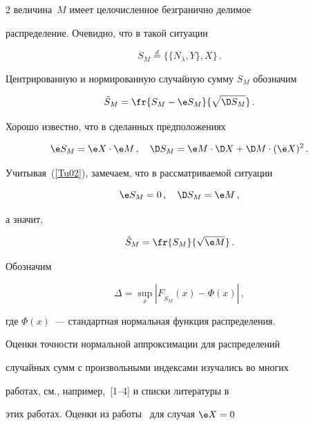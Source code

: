 \begin{multicols}{2}
величина~$M$ имеет целочисленное безгранично делимое


распределение. Очевидно, что в такой ситуации


\begin{equation}


S_M \stackrel{d}{=} \{\{N_{\lambda},Y\},X\}\,.


\label{gp1}


\end{equation}


Центрированную и нормированную случайную сумму $S_M$ обозначим


$$


\tilde{S}_M = \fr{S_M - \e S_M}{\sqrt{\D S_M}}\,.


$$


Хорошо известно, что в сделанных предположениях


$$


\e S_M =\e X\cdot \e M\,,\quad \D S_M = \e M \cdot \D X + \D M


\cdot (\e X)^2\,.


$$


Учитывая~(\ref{Tu02}), замечаем, что в рассматриваемой ситуации


\begin{equation}


\label{Tu043} \e S_M =0\,,\quad \D S_M = \e M\,,


\end{equation}


а значит,


$$


\tilde{S}_M = \fr{S_M}{\sqrt{\e M}}\,.


$$


Обозначим


$$


\Delta = \sup\limits_x\left|F_{\tilde{S}_M}(x) - \Phi(x)\right|\,,


$$


где $\Phi(x)$~--- стандартная нормальная функция распределения.





Оценки точности нормальной аппроксимации для распределений


случайных сумм с произвольными индексами изучались во многих


работах, см., например,~[1--4] и списки литературы в


этих работах. Оценки из работы~\cite{6g} для случая $\e X = 0$



\end{multicols}

